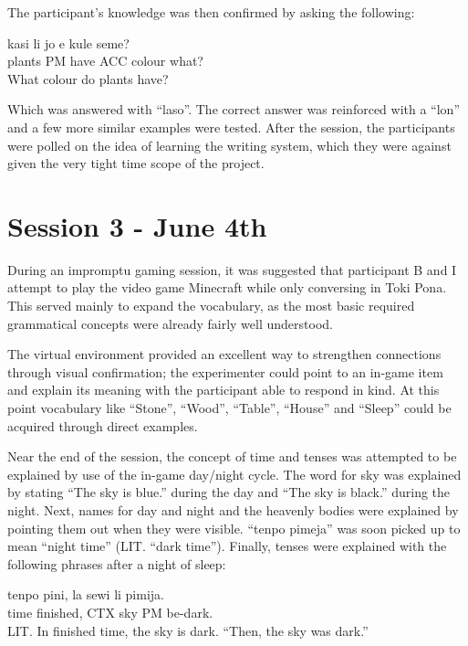 \documentclass[a4paper,10pt]{article}
\begin{document}
The participant's knowledge was then confirmed by asking the following:

\begin{exe}
 \ex
 \gll kasi li jo e kule seme? \\
 plants PM have ACC colour what?\\
 \glt What colour do plants have?
\end{exe}

Which was answered with ``laso''. The correct answer was reinforced
with a ``lon'' and a few more similar examples were tested.
After the session, the participants were polled on the idea of
learning the writing system, which they were against given the
very tight time scope of the project.

\section{Session 3 - June 4th}
During an impromptu gaming session, it was suggested that participant B
and I attempt to play the video game Minecraft while only conversing
in Toki Pona. This served mainly to expand the vocabulary, as the most
basic required grammatical concepts were already fairly well understood.

The virtual environment provided an excellent way to strengthen connections
through visual confirmation; the experimenter could point to an in-game item
and explain its meaning with the participant able to respond in kind. At
this point vocabulary like ``Stone'', ``Wood'', ``Table'', ``House'' and
``Sleep'' could be acquired through direct examples.

Near the end of the session, the concept of time and tenses was attempted
to be explained by use of the in-game day/night cycle. The word for sky
was explained by stating ``The sky is blue.'' during the day and ``The
sky is black.'' during the night. Next, names for day and night and the
heavenly bodies were explained by pointing them out when they were visible.
``tenpo pimeja'' was soon picked up to mean ``night time'' (LIT. ``dark time'').
Finally, tenses were explained with the following phrases after a night of
sleep:

\begin{exe}
 \ex
 \gll tenpo pini, la sewi li pimija. \\
 time finished, CTX sky PM be-dark.\\
 \glt LIT. In finished time, the sky is dark.
 \glt ``Then, the sky was dark.''
\end{exe}
\end{document}
